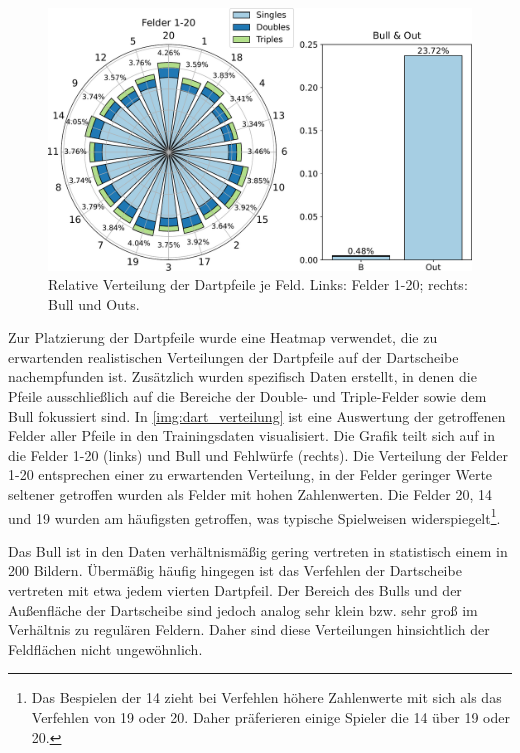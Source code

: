 \begin{figure}
    \centering
    \includegraphics[width=\textwidth]{imgs/rendering/ergebnisse/dartboard_stacked_final.pdf}
    \caption{Relative Verteilung der Dartpfeile je Feld. Links: Felder 1-20; rechts: Bull und Outs.}
    \label{img:dart_verteilung}
\end{figure}

Zur Platzierung der Dartpfeile wurde eine Heatmap verwendet, die zu erwartenden realistischen Verteilungen der Dartpfeile auf der Dartscheibe nachempfunden ist. Zusätzlich wurden spezifisch Daten erstellt, in denen die Pfeile ausschließlich auf die Bereiche der Double- und Triple-Felder sowie dem Bull fokussiert sind. In \autoref{img:dart_verteilung} ist eine Auswertung der getroffenen Felder aller Pfeile in den Trainingsdaten visualisiert. Die Grafik teilt sich auf in die Felder 1-20 (links) und Bull und Fehlwürfe (rechts). Die Verteilung der Felder 1-20 entsprechen einer zu erwartenden Verteilung, in der Felder geringer Werte seltener getroffen wurden als Felder mit hohen Zahlenwerten. Die Felder 20, 14 und 19 wurden am häufigsten getroffen, was typische Spielweisen widerspiegelt\footnote{Das Bespielen der 14 zieht bei Verfehlen höhere Zahlenwerte mit sich als das Verfehlen von 19 oder 20. Daher präferieren einige Spieler die 14 über 19 oder 20.}.

Das Bull ist in den Daten verhältnismäßig gering vertreten in statistisch einem in 200 Bildern. Übermäßig häufig hingegen ist das Verfehlen der Dartscheibe vertreten mit etwa jedem vierten Dartpfeil. Der Bereich des Bulls und der Außenfläche der Dartscheibe sind jedoch analog sehr klein bzw. sehr groß im Verhältnis zu regulären Feldern. Daher sind diese Verteilungen hinsichtlich der Feldflächen nicht ungewöhnlich.

